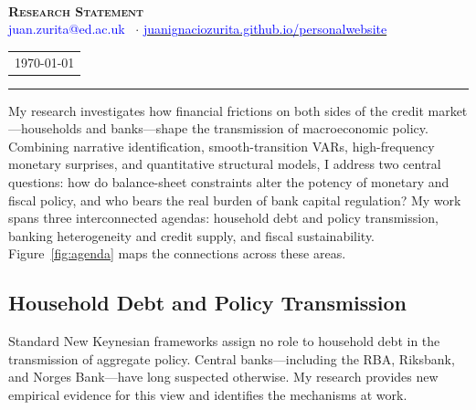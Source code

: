 \documentclass[12pt,a4paper]{article}
\begin{document}
\pagestyle{fancy}
\fancyhf{}
\fancyfoot[C]{\thepage}

\thispagestyle{firstpage}

\vspace{-0.2cm}

\begin{center}
{\LARGE {}} \\
\vspace{0.5em}
\textbf{{\Large \textsc{Research Statement}}}
\\
\vspace{0.5cm}
{\small{\textcolor{blue}{juan.zurita@ed.ac.uk} \ $\cdot$ \href{https://juanignaciozurita.github.io/personalwebsite/}{\textcolor{blue}{juanignaciozurita.github.io/personalwebsite}}}}\\
\vspace{-0.0cm}
\begin{tabular}{c @{}}
	\monthyeardate\today
\end{tabular}
\end{center}
\vspace{-1cm}
{\color{BrickRed}\rule{\textwidth}{2pt}}

My research investigates how financial frictions on both sides of the credit market---households and banks---shape the transmission of macroeconomic policy. Combining narrative identification, smooth-transition VARs, high-frequency monetary surprises, and quantitative structural models, I address two central questions: how do balance-sheet constraints alter the potency of monetary and fiscal policy, and who bears the real burden of bank capital regulation? My work spans three interconnected agendas: household debt and policy transmission, banking heterogeneity and credit supply, and fiscal sustainability. Figure~\ref{fig:agenda} maps the connections across these areas.

\subsection*{Household Debt and Policy Transmission}
\vspace{-0.3cm}

Standard New Keynesian frameworks assign no role to household debt in the transmission of aggregate policy. Central banks---including the RBA, Riksbank, and Norges Bank---have long suspected otherwise. My research provides new empirical evidence for this view and identifies the mechanisms at work.
\end{document}
